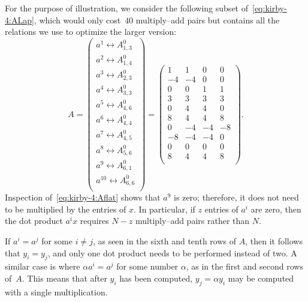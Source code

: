 For the purpose of illustration, we consider the following subset
of~\eqref{eq:kirby-4:ALap}, which would only cost~$40$ multiply--add
pairs but contains all the relations we use to optimize the larger version:
\begin{equation} \label{eq:kirby-4:Aflat}
A =
\left(
\begin{array}{c}
  a^1 \leftrightarrow A^0_{1,3} \\
  a^2 \leftrightarrow A^0_{1,4} \\
  a^3 \leftrightarrow A^0_{2,3} \\
  a^4 \leftrightarrow A^0_{3,3} \\
  a^5 \leftrightarrow A^0_{4,6} \\
  a^6 \leftrightarrow A^0_{4,4} \\
  a^7 \leftrightarrow A^0_{4,5} \\
  a^8 \leftrightarrow A^0_{5,6} \\
  a^9 \leftrightarrow A^0_{6,1} \\
  a^{10} \leftrightarrow A^0_{6,6} \\
\end{array}
\right)
 =
\left(
\begin{array}{cccc}
1 & 1 & 0 & 0 \\
-4 & -4 & 0 & 0 \\
0 & 0 & 1 & 1 \\
3 & 3 & 3 & 3 \\
0 & 4 & 4 & 0 \\
8 & 4 & 4 & 8 \\
0 & -4 & -4 & -8 \\
-8 & -4 & -4 & 0 \\
 0 & 0 & 0 & 0 \\
8 & 4 & 4 & 8 \\
\end{array}
\right).
\end{equation}
%
Inspection of~\eqref{eq:kirby-4:Aflat} shows that $ a^9 $ is
zero; therefore, it does not need to be multiplied by the entries of $
x $. In particular, if $ z $ entries of $ a^i $ are zero, then the dot
product $ a^i x $ requires $ N - z $ multiply--add pairs rather than $
N $.

If $ a^i = a^j $ for some $ i \neq j $, as seen in the sixth and tenth
rows of $ A $, then it follows that $ y_i = y_j $, and only one dot
product needs to be performed instead of two. A similar case is where
$\alpha a^i = a^j $ for some number $ \alpha $, as in the first and
second rows of~$A$. This means that after $ y_i $ has been computed,
$y_j = \alpha y_i$ may be computed with a single multiplication.

